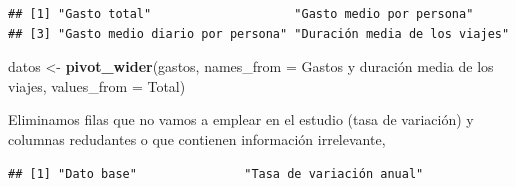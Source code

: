 \documentclass[data,article,submit,moreauthors,pdftex]{Definitions/mdpi}
\newenvironment{Shaded}{\begin{snugshade}}{\end{snugshade}}
\newcommand{\AttributeTok}[1]{\textcolor[rgb]{0.13,0.29,0.53}{#1}}
\newcommand{\CommentTok}[1]{\textcolor[rgb]{0.56,0.35,0.01}{\textit{#1}}}
\newcommand{\DecValTok}[1]{\textcolor[rgb]{0.00,0.00,0.81}{#1}}
\newcommand{\FunctionTok}[1]{\textcolor[rgb]{0.13,0.29,0.53}{\textbf{#1}}}
\newcommand{\NormalTok}[1]{#1}
\newcommand{\OtherTok}[1]{\textcolor[rgb]{0.56,0.35,0.01}{#1}}
\newcommand{\SpecialCharTok}[1]{\textcolor[rgb]{0.81,0.36,0.00}{\textbf{#1}}}
\newcommand{\StringTok}[1]{\textcolor[rgb]{0.31,0.60,0.02}{#1}}
\begin{document}
\begin{Shaded}
\end{Shaded}

\begin{verbatim}
## [1] "Gasto total"                    "Gasto medio por persona"       
## [3] "Gasto medio diario por persona" "Duración media de los viajes"
\end{verbatim}

\begin{Shaded}
\begin{Highlighting}[]
\NormalTok{datos }\OtherTok{\textless{}{-}} \FunctionTok{pivot\_wider}\NormalTok{(gastos, }\AttributeTok{names\_from =} \StringTok{\textasciigrave{}}\AttributeTok{Gastos y duración media de los viajes}\StringTok{\textasciigrave{}}\NormalTok{,}
    \AttributeTok{values\_from =}\NormalTok{ Total)}
\end{Highlighting}
\end{Shaded}

Eliminamos filas que no vamos a emplear en el estudio (tasa de
variación) y columnas redudantes o que contienen información
irrelevante,

\begin{Shaded}
\end{Shaded}

\begin{verbatim}
## [1] "Dato base"               "Tasa de variación anual"
\end{verbatim}

\begin{Shaded}
\end{Shaded}
\end{document}
